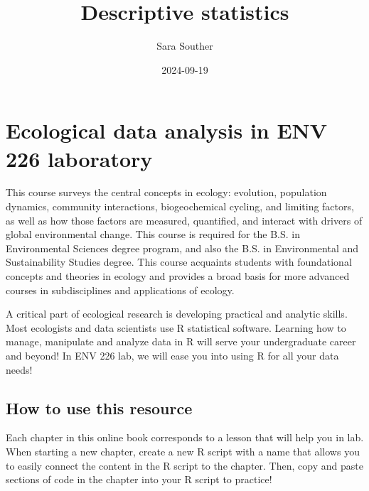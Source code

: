 \documentclass[
]{book}
\title{Descriptive statistics}
\author{Sara Souther}
\date{2024-09-19}
\newenvironment{Shaded}{\begin{snugshade}}{\end{snugshade}}
\newcommand{\AttributeTok}[1]{\textcolor[rgb]{0.13,0.29,0.53}{#1}}
\newcommand{\ConstantTok}[1]{\textcolor[rgb]{0.56,0.35,0.01}{#1}}
\newcommand{\FunctionTok}[1]{\textcolor[rgb]{0.13,0.29,0.53}{\textbf{#1}}}
\newcommand{\NormalTok}[1]{#1}
\newcommand{\SpecialCharTok}[1]{\textcolor[rgb]{0.81,0.36,0.00}{\textbf{#1}}}
\begin{document}
\maketitle

{
\setcounter{tocdepth}{1}
\tableofcontents
}
\hypertarget{ecological-data-analysis-in-env-226-laboratory}{%
\chapter{Ecological data analysis in ENV 226 laboratory}\label{ecological-data-analysis-in-env-226-laboratory}}

This course surveys the central concepts in ecology: evolution, population dynamics, community interactions, biogeochemical cycling, and limiting factors, as well as how those factors are measured, quantified, and interact with drivers of global environmental change. This course is required for the B.S. in Environmental Sciences degree program, and also the B.S. in Environmental and Sustainability Studies degree. This course acquaints students with foundational concepts and theories in ecology and provides a broad basis for more advanced courses in subdisciplines and applications of ecology.

A critical part of ecological research is developing practical and analytic skills. Most ecologists and data scientists use R statistical software. Learning how to manage, manipulate and analyze data in R will serve your undergraduate career and beyond! In ENV 226 lab, we will ease you into using R for all your data needs!

\hypertarget{how-to-use-this-resource}{%
\section{How to use this resource}\label{how-to-use-this-resource}}

Each chapter in this online book corresponds to a lesson that will help you in lab. When starting a new chapter, create a new R script with a name that allows you to easily connect the content in the R script to the chapter. Then, copy and paste sections of code in the chapter into your R script to practice!

\begin{Shaded}
\end{Shaded}
\end{document}
